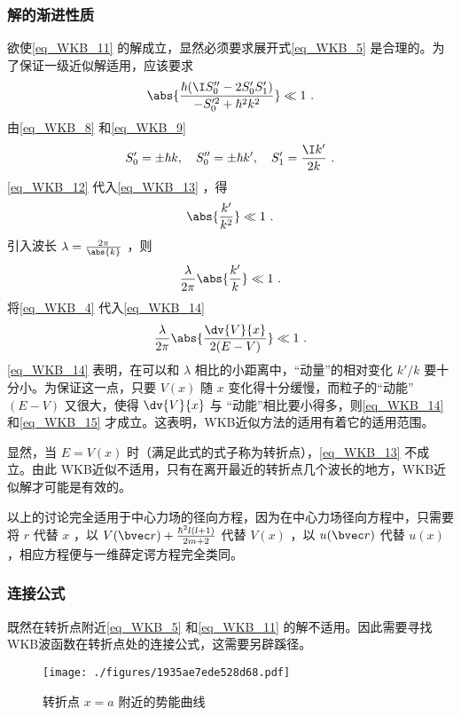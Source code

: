 \subsubsection{解的渐进性质}
欲使\autoref{eq_WKB_11} 的解成立，显然必须要求展开式\autoref{eq_WKB_5} 是合理的。为了保证一级近似解适用，应该要求
\begin{equation}\label{eq_WKB_13}
\abs{\frac{\hbar(\I S_0''-2S_0'S_1')}{-S_0'^2+\hbar^2k^2}}\ll1~.
\end{equation}
由\autoref{eq_WKB_8} 和\autoref{eq_WKB_9} 
\begin{equation}\label{eq_WKB_12}
S_0'=\pm\hbar k,\quad S_0''=\pm\hbar k',\quad S_1'=\frac{\I k'}{2k}~.
\end{equation}
\autoref{eq_WKB_12} 代入\autoref{eq_WKB_13} ，得
\begin{equation}
\abs{\frac{k'}{k^2}}\ll1~.
\end{equation}
引入波长 $\lambda=\frac{2\pi}{\abs{k}}$ ，则
\begin{equation}\label{eq_WKB_14}
\frac{\lambda}{2\pi}\abs{\frac{k'}{k}}\ll1~.
\end{equation}
将\autoref{eq_WKB_4} 代入\autoref{eq_WKB_14} 
\begin{equation}\label{eq_WKB_15}
\frac{\lambda}{2\pi}\abs{\frac{\dv{V}{x}}{2(E-V)}}\ll1~.
\end{equation}
\autoref{eq_WKB_14} 表明，在可以和 $\lambda$ 相比的小距离中，“动量”的相对变化 $k'/k$ 要十分小。为保证这一点，只要 $V(x)$ 随 $x$ 变化得十分缓慢，而粒子的“动能” $(E-V)$ 又很大，使得 $\dv{V}{x}$ 与 “动能”相比要小得多，则\autoref{eq_WKB_14} 和\autoref{eq_WKB_15} 才成立。这表明，WKB近似方法的适用有着它的适用范围。

显然，当 $E=V(x)$ 时（满足此式的式子称为转折点），\autoref{eq_WKB_13} 不成立。由此 WKB近似不适用，只有在离开最近的转折点几个波长的地方，WKB近似解才可能是有效的。

以上的讨论完全适用于中心力场的径向方程，因为在中心力场径向方程中，只需要将 $r$ 代替 $x$ ，以 $V(\bvec r)+\frac{\hbar^2l(l+1)}{2m+2}$ 代替 $V(x)$ ，以 $u(\bvec r)$ 代替 $u(x)$ ，相应方程便与一维薛定谔方程完全类同。
\subsubsection{连接公式}
既然在转折点附近\autoref{eq_WKB_5} 和\autoref{eq_WKB_11} 的解不适用。因此需要寻找 WKB波函数在转折点处的连接公式，这需要另辟蹊径。
\begin{figure}[ht]
\centering
\texttt{[image: ./figures/1935ae7ede528d68.pdf]}
\caption{转折点 $x=a$ 附近的势能曲线} \label{fig_WKB_1}
\end{figure}

